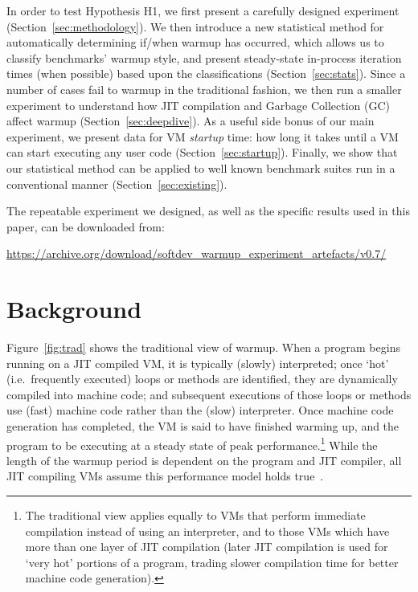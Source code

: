 \documentclass[preprint,numbers,10pt]{sigplanconf}
\begin{document}
\noindent In order to test Hypothesis H1, we first present a carefully designed
experiment (Section~\ref{sec:methodology}). We then introduce a new
statistical method for automatically determining if/when warmup has occurred,
which allows us to classify benchmarks' warmup style, and present steady-state
in-process iteration times (when possible) based upon the classifications
(Section~\ref{sec:stats}). Since a number of cases fail to warmup in the
traditional fashion, we then run a smaller experiment to understand how JIT
compilation and Garbage Collection (GC) affect warmup
(Section~\ref{sec:deepdive}). As a useful side bonus of our main experiment,
we present data for VM \emph{startup} time: how long it takes until a VM can
start executing any user code (Section~\ref{sec:startup}). Finally, we show that
our statistical method can be applied to well known benchmark suites run in a
conventional manner (Section~\ref{sec:existing}).

The repeatable experiment we designed, as well as the specific results used
in this paper, can be downloaded from:
\vspace{-.5em}
\begin{center}
\url{https://archive.org/download/softdev_warmup_experiment_artefacts/v0.7/}
\end{center}


\section{Background}
\label{sec:warmup}

Figure~\ref{fig:trad} shows the traditional view of warmup.
When a program begins running on a JIT compiled VM, it is typically (slowly)
interpreted; once `hot' (i.e.~frequently executed) loops or methods are
identified, they are dynamically compiled into machine code; and subsequent
executions of those loops or methods use (fast) machine code rather than the
(slow) interpreter. Once machine code generation has completed, the VM is
said to have finished warming up, and the program to be executing
at a steady state of peak performance.\footnote{The traditional view applies equally to VMs
that perform immediate compilation instead of using an interpreter, and to
those VMs which have more than one layer of JIT compilation (later JIT
compilation is used for `very hot' portions of a program, trading slower
compilation time for better machine code generation).}
While the length of the warmup period
is dependent on the program and JIT compiler, all JIT compiling
VMs assume this performance model holds true~\cite{kalibera13rigorous}.
\end{document}
